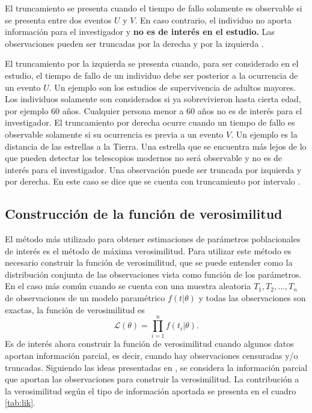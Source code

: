 \documentclass[11pt,a4paper]{article}
\begin{document}
El truncamiento se presenta cuando el tiempo de fallo solamente es observable si se presenta entre dos eventos $U$ y $V$. En caso contrario, el individuo no aporta información para el investigador y \textbf{no es de interés en el estudio.} Las observaciones pueden ser truncadas por la derecha y por la izquierda \citep{klein}.

El truncamiento por la izquierda se presenta cuando, para ser considerado en el estudio, el tiempo de fallo de un individuo debe ser posterior  a la ocurrencia de un evento $U$. Un ejemplo son los estudios de supervivencia de adultos mayores. Los individuos solamente son considerados si ya sobrevivieron hasta cierta edad, por ejemplo 60 años. Cualquier persona menor a 60 años no es de interés para el investigador. El truncamiento por derecha ocurre cuando un tiempo de fallo es observable solamente si su ocurrencia es previa a un evento $V$. Un ejemplo es la distancia de las estrellas a la Tierra. Una estrella que se encuentra más lejos de lo que pueden detectar los telescopios modernos no será observable y no es de interés para el investigador. Una observación puede ser truncada por izquierda y por derecha. En este caso se dice que se cuenta con truncamiento por intervalo \citep{klein}.

\subsection{Construcción de la función de verosimilitud}
\label{sec:ver}

El método más utilizado para obtener estimaciones de parámetros poblacionales de interés es el método de máxima verosimilitud. Para utilizar este método es necesario construir la función de verosimilitud, que se puede entender como la distribución conjunta de las observaciones vista como función de los parámetros. En el caso más común cuando se cuenta con una muestra aleatoria $T_1, T_2, \dots, T_n$ de observaciones de un modelo paramétrico $f(t|\theta)$ y todas las observaciones son exactas, la función de verosimilitud es $$\mathcal{L}(\theta) = \prod_{i = 1}^n f(t_i|\theta).$$ Es de interés ahora construir la función de verosimilitud cuando algunos datos aportan información parcial, es decir, cuando hay observaciones censuradas y/o truncadas. Siguiendo las ideas presentadas en \citet{klein}, se considera la información parcial que aportan las observaciones para construir la verosimilitud. La contribución a la verosimilitud según el tipo de información aportada se presenta en el cuadro \ref{tab:lik}.
\end{document}
